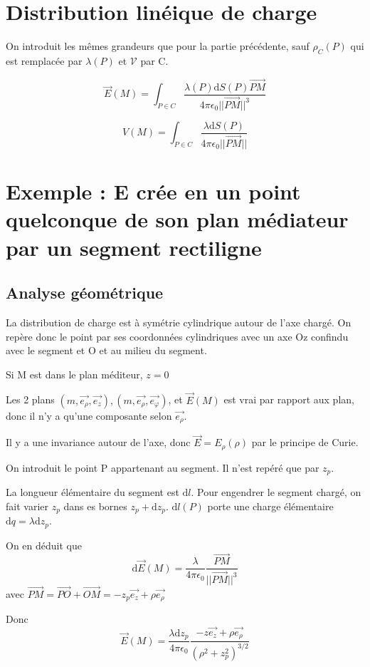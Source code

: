 \documentclass[french]{yLectureNote}
\renewcommand{\vec}{\overrightarrow}
\newcommand{\dd}{\mathrm{d}}
\newcommand{\norm}[1]{||\vec{#1}||}
\newcommand{\E}{\vec{E}(M)}
\newcommand{\er}{\vec{e_{\rho}}}
\newcommand{\ep}{\vec{e_{\varphi}}}
\newcommand{\mv}{\mathcal{V}}
\begin{document}
  \section{Distribution linéique de charge}
On introduit les m\^emes grandeurs que pour la partie précédente, sauf  \(\rho_C(P)\) qui est remplacée par  \(\lambda(P)\) et \(\mv\) par C.

 \begin{theorem}
\[\E = \int_{P\in C} \frac{\lambda(P)\dd S(P)\vec{PM}}{4\pi\epsilon_0 \norm{PM}^3}\]
 \end{theorem}
 \begin{theorem}
\[V(M) = \int_{P\in C} \frac{\lambda \dd S(P)}{4\pi\epsilon_0 \norm{PM}}\]
 \end{theorem}
\section{Exemple : E crée en un point quelconque de son plan médiateur par un segment rectiligne}
 \subsection{Analyse géométrique}
La distribution de charge est à symétrie cylindrique autour de l'axe chargé. On repère donc le point par ses coordonnées cylindriques avec un axe Oz confindu avec le segment et O et au milieu du segment.

Si M est dans le plan méditeur, \(z=0\)

Les 2 plans \((m, \er, \vec{e_z}), (m, \er, \ep)\), et \(\E\) est vrai par rapport aux plan, donc il n'y a qu'une composante selon \(\er\).

Il y a une invariance autour de l'axe, donc \(\vec{E} = E_{\rho}(\rho)\) par le principe de Curie.

On introduit le point P appartenant au segment. Il n'est repéré que par \(z_p\).

La longueur élémentaire du segment est \(\dd l\). Pour engendrer le segment chargé, on fait varier \(z_p\) dans es bornes \(z_p+\dd z_p\). \(\dd l(P)\) porte une charge élémentaire \(\dd q = \lambda \dd z_p\).

On en déduit que \[\dd \E = \frac{\lambda}{4\pi\epsilon_0} \frac{\vec{PM}}{\norm{PM}^3}\] avec \(\vec{PM} = \vec{PO} + \vec{OM} = -z_p\vec{e_z}+\rho\er\)

Donc \[\E = \frac{\lambda \dd z_p}{4\pi \epsilon_0}\frac{-z\vec{e_z}+\rho\er}{(\rho^2+z_p^2)^{3/2}}\]
\end{document}
